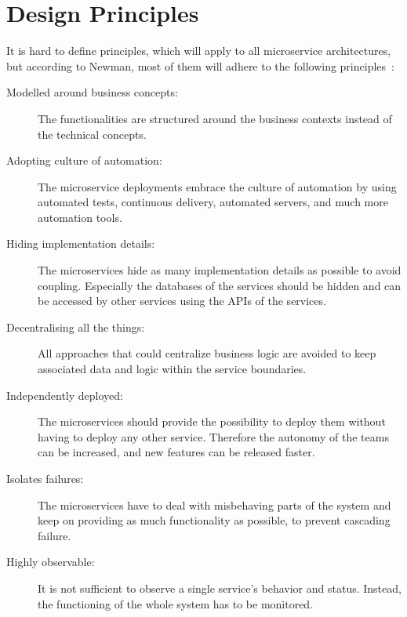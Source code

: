 \section{Design Principles}
It is hard to define principles, which will apply to all microservice architectures, but according to Newman, most of them will adhere to the following principles~\cite{newman2021building}: 
\begin{description}
    \item[Modelled around business concepts:] The functionalities are structured around the business contexts instead of the technical concepts.
    \item[Adopting culture of automation:] The microservice deployments embrace the culture of automation by using automated tests, continuous delivery, automated servers, and much more automation tools.
    \item[Hiding implementation details:] The microservices hide as many implementation details as possible to avoid coupling.
		Especially the databases of the services should be hidden and can be accessed by other services using the APIs of the services.
    \item[Decentralising all the things:] All approaches that could centralize business logic are avoided to keep associated data and logic within the service boundaries.
    \item[Independently deployed:] The microservices should provide the possibility to deploy them without having to deploy any other service.
		Therefore the autonomy of the teams can be increased, and new features can be released faster.
    \item[Isolates failures:] The microservices have to deal with misbehaving parts of the system and keep on providing as much functionality as possible, to prevent cascading failure.
    \item[Highly observable:] It is not sufficient to observe a single service's behavior and status.
		Instead, the functioning of the whole system has to be monitored.
\end{description}


